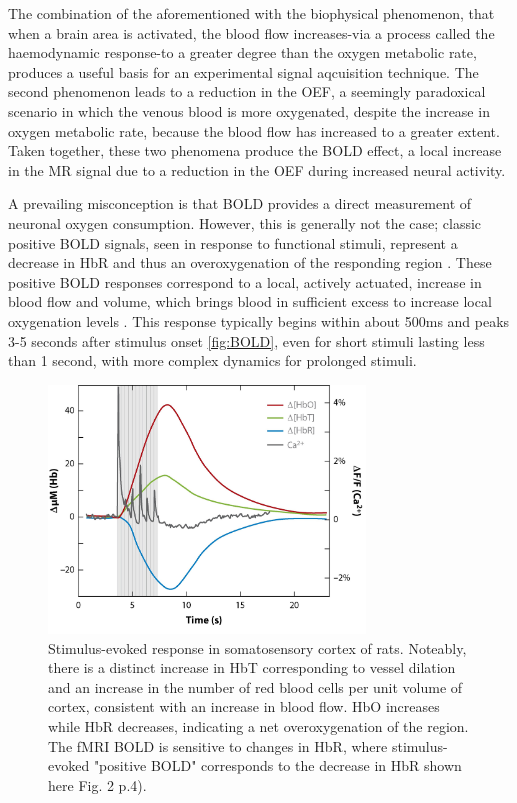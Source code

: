 The combination of the aforementioned with the biophysical phenomenon, that when a brain area is activated, the blood flow increases-via a process called the haemodynamic response-to a greater degree than the oxygen metabolic rate, produces a useful basis for an experimental signal aqcuisition technique. The second phenomenon leads to a reduction in the \gls{OEF}, a seemingly paradoxical scenario in which the venous blood is more oxygenated, despite the increase in oxygen metabolic rate, because the blood flow has increased to a greater extent. Taken together, these two phenomena produce the \gls{BOLD} effect, a local increase in the \gls{MR} signal due to a reduction in the \gls{OEF} during increased neural activity. \cite{Buxton2013}

A prevailing misconception is that \gls{BOLD} provides a direct measurement of neuronal oxygen consumption. However, this is generally not the case; classic positive \gls{BOLD} signals, seen in response to functional stimuli, represent a decrease in \gls{HbR} and thus an overoxygenation of the responding region \cite{Attwell2002}. These positive \gls{BOLD} responses correspond to a local, actively actuated, increase in blood flow and volume, which brings blood in sufficient excess to increase local oxygenation levels \cite{Raichle1998}. This response typically begins within about 500ms and peaks 3-5 seconds after stimulus onset \autoref{fig:BOLD}, even for short stimuli lasting less than 1 second, with more complex dynamics for prolonged stimuli.

\begin{figure}[htbp]
    \centering
    \includegraphics[width = 0.75\textwidth]{assets/images/Hb_flactuations_BOLD.jpg}
    \caption{Stimulus-evoked response in somatosensory cortex of rats. Noteably, there is a distinct increase in \gls{HbT} corresponding to vessel dilation and an increase in the number of red blood cells per unit volume of cortex, consistent with an increase in blood flow. \gls{HbO} increases while \gls{HbR} decreases, indicating a net overoxygenation of the region. The \gls{fMRI} \gls{BOLD} is sensitive to changes in \gls{HbR}, where stimulus-evoked "positive \gls{BOLD}" corresponds to the decrease in \gls{HbR} shown here \cite{Hillman2007} Fig. 2 p.4).}
    \label{fig:BOLD}
\end{figure}

